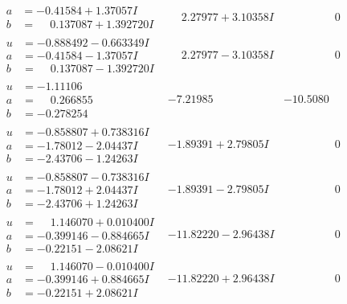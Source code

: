\documentclass[1p]{elsarticle_modified}
\theoremstyle{definition}
\begin{document}
$$\begin{array}{c|c|c}
\begin{aligned}
a &= -0.41584 + 1.37057 I \\
b &= \phantom{-}0.137087 + 1.392720 I\end{aligned}
 & \phantom{-}2.27977 + 3.10358 I & \phantom{-0.000000 } 0 \\ \hline\begin{aligned}
u &= -0.888492 - 0.663349 I \\
a &= -0.41584 - 1.37057 I \\
b &= \phantom{-}0.137087 - 1.392720 I\end{aligned}
 & \phantom{-}2.27977 - 3.10358 I & \phantom{-0.000000 } 0 \\ \hline\begin{aligned}
u &= -1.11106\phantom{ +0.000000I} \\
a &= \phantom{-}0.266855\phantom{ +0.000000I} \\
b &= -0.278254\phantom{ +0.000000I}\end{aligned}
 & -7.21985\phantom{ +0.000000I} & -10.5080\phantom{ +0.000000I} \\ \hline\begin{aligned}
u &= -0.858807 + 0.738316 I \\
a &= -1.78012 - 2.04437 I \\
b &= -2.43706 - 1.24263 I\end{aligned}
 & -1.89391 + 2.79805 I & \phantom{-0.000000 } 0 \\ \hline\begin{aligned}
u &= -0.858807 - 0.738316 I \\
a &= -1.78012 + 2.04437 I \\
b &= -2.43706 + 1.24263 I\end{aligned}
 & -1.89391 - 2.79805 I & \phantom{-0.000000 } 0 \\ \hline\begin{aligned}
u &= \phantom{-}1.146070 + 0.010400 I \\
a &= -0.399146 - 0.884665 I \\
b &= -0.22151 - 2.08621 I\end{aligned}
 & -11.82220 - 2.96438 I & \phantom{-0.000000 } 0 \\ \hline\begin{aligned}
u &= \phantom{-}1.146070 - 0.010400 I \\
a &= -0.399146 + 0.884665 I \\
b &= -0.22151 + 2.08621 I\end{aligned}
 & -11.82220 + 2.96438 I & \phantom{-0.000000 } 0 \\ \hline\begin{aligned}

\end{aligned}
\end{array}$$
\end{document}
